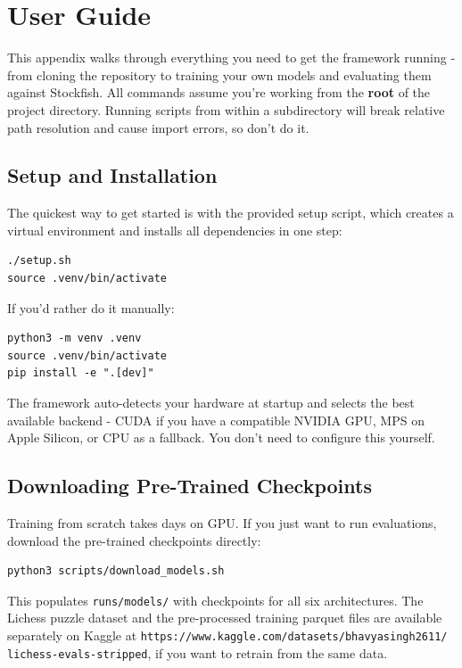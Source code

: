 \chapter{User Guide}

This appendix walks through everything you need to get the framework running - from cloning the repository to training your own models and evaluating them against Stockfish. All commands assume you're working from the \textbf{root} of the project directory. Running scripts from within a subdirectory will break relative path resolution and cause import errors, so don't do it.

\section{Setup and Installation}

The quickest way to get started is with the provided setup script, which creates a virtual environment and installs all dependencies in one step:

\begin{verbatim}
./setup.sh
source .venv/bin/activate
\end{verbatim}

If you'd rather do it manually:

\begin{verbatim}
python3 -m venv .venv
source .venv/bin/activate
pip install -e ".[dev]"
\end{verbatim}

The framework auto-detects your hardware at startup and selects the best available backend - CUDA if you have a compatible NVIDIA GPU, MPS on Apple Silicon, or CPU as a fallback. You don't need to configure this yourself.

\section{Downloading Pre-Trained Checkpoints}

Training from scratch takes days on GPU. If you just want to run evaluations, download the pre-trained checkpoints directly:

\begin{verbatim}
python3 scripts/download_models.sh
\end{verbatim}

This populates \texttt{runs/models/} with checkpoints for all six architectures. The Lichess puzzle dataset and the pre-processed training parquet files are available separately on Kaggle at \texttt{https://www.kaggle.com/datasets/bhavyasingh2611/\\lichess-evals-stripped}, if you want to retrain from the same data.


